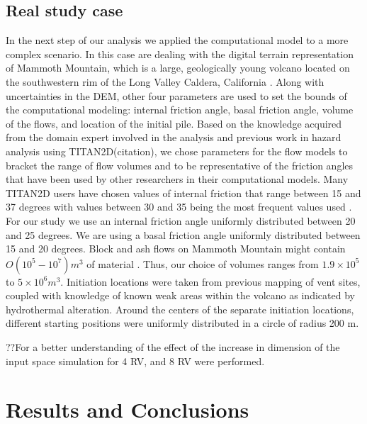 \documentclass{article}
\begin{document}
\subsection{Real study case}
In the next step of our analysis we applied the computational model to
a more complex scenario. In this case are dealing with the digital terrain
representation of Mammoth Mountain, which is a large, geologically 
young volcano located on the southwestern rim of the Long Valley 
Caldera, California \citep{Bailey1989}. 
Along with uncertainties in the DEM, other four 
parameters are used to set the bounds of the computational modeling:
internal friction angle, basal friction angle, volume of the flows, and location 
of the initial pile. 
Based on the knowledge acquired from the domain expert  involved in the 
analysis and previous work in hazard analysis using TITAN2D(citation), we 
chose parameters for the flow models to bracket the range of flow volumes 
and to be representative of the friction angles that have been used by other
researchers in their computational models.  
Many TITAN2D users have chosen values of internal friction that range between
15 and 37 degrees with
values between 30 and 35 being the most frequent values used
\citep{Patra2005, murcia_2010}.  For our study we use an internal
friction angle uniformly distributed between 20 and 25 degrees.
We are using a basal friction angle
uniformly distributed between 15 and 20 degrees.
Block and ash flows on Mammoth Mountain might contain $O(10^5 -
10^7) m^3$ of material \citep{Patra2005, Burkett2007}.  Thus, our
choice of volumes ranges from $1.9 \times 10^5$ to $5 \times 10^6
m^3$.  
Initiation locations were taken from previous mapping of vent sites,
coupled with knowledge of known weak areas within the volcano as
indicated by hydrothermal alteration.  Around the centers of the
separate initiation locations, different starting positions were
uniformly distributed in a circle of radius 200 m.  

??For a better understanding of the effect of the increase in dimension
of the input space simulation for 4 RV,  and 8 RV were performed.


\section{Results and Conclusions}
\end{document}
